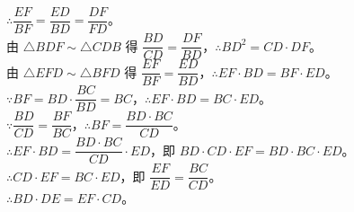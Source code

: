 \documentclass{exam-zh}
\begin{document}
\begin{problem}[points=12]
\begin{solutionblock}
{$\therefore \dfrac{EF}{BF}=\dfrac{ED}{BD}=\dfrac{DF}{FD}$。 \\
由 $\triangle BDF\sim\triangle CDB$ 得 $\dfrac{BD}{CD}=\dfrac{DF}{BD}$，$\therefore BD^2=CD\cdot DF$。 \\
由 $\triangle EFD\sim\triangle BFD$ 得 $\dfrac{EF}{BF}=\dfrac{ED}{BD}$，$\therefore EF\cdot BD=BF\cdot ED$。 \\
$\because BF=BD\cdot\dfrac{BC}{BD}=BC$，$\therefore EF\cdot BD=BC\cdot ED$。 \\
$\because \dfrac{BD}{CD}=\dfrac{BF}{BC}$，$\therefore BF=\dfrac{BD\cdot BC}{CD}$。 \\
$\therefore EF\cdot BD=\dfrac{BD\cdot BC}{CD}\cdot ED$，即 $BD\cdot CD\cdot EF=BD\cdot BC\cdot ED$。 \\
$\therefore CD\cdot EF=BC\cdot ED$，即 $\dfrac{EF}{ED}=\dfrac{BC}{CD}$。 \\
$\therefore BD\cdot DE=EF\cdot CD$。
}
  \end{solutionblock}
\end{problem}

\newpage


\end{document}
